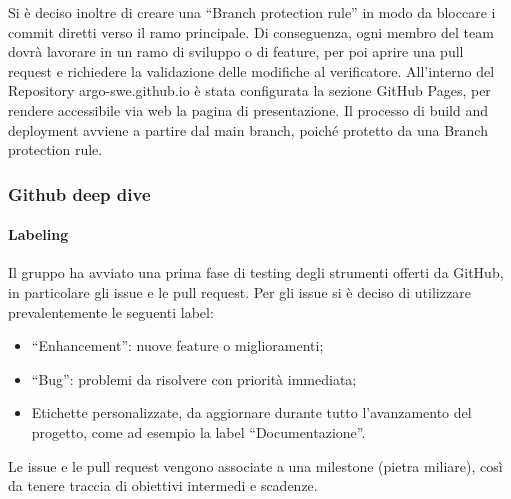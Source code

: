 Si è deciso inoltre di creare una “Branch protection rule” in modo da bloccare i commit diretti verso il ramo principale. Di conseguenza, ogni membro del team dovrà lavorare in un ramo di sviluppo o di feature, per poi aprire una pull request e richiedere la validazione delle modifiche al verificatore. All'interno del Repository argo-swe.github.io è stata configurata la sezione GitHub Pages, per rendere accessibile via web la pagina di presentazione. Il processo di build and deployment avviene a partire dal main branch, poiché protetto da una Branch protection rule.

\subsubsection{Github deep dive}
\paragraph{Labeling}
Il gruppo ha avviato una prima fase di testing degli strumenti offerti da GitHub, in particolare gli issue e le pull request. Per gli issue si è deciso di utilizzare prevalentemente le seguenti label:
\begin{itemize}
	\item “Enhancement”: nuove feature o miglioramenti;
	\item “Bug”: problemi da risolvere con priorità immediata;
	\item Etichette personalizzate, da aggiornare durante tutto l’avanzamento del progetto, come ad esempio la label “Documentazione”.
\end{itemize}

Le issue e le pull request vengono associate a una milestone (pietra miliare), così da tenere traccia di obiettivi intermedi e scadenze. 


